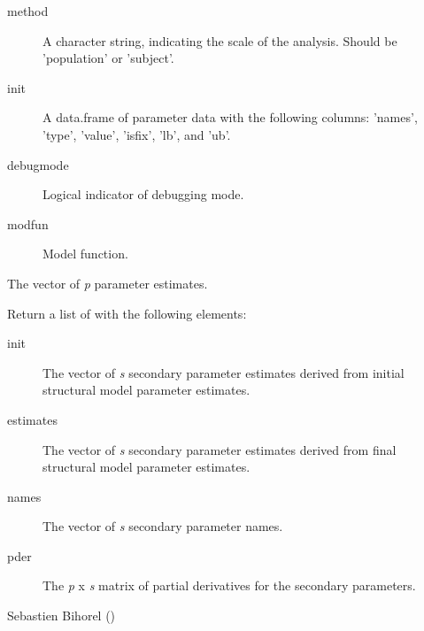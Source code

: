 \begin{Arguments}
\begin{ldescription}
\begin{description}
\item[method] A character string, indicating the scale of the analysis. Should
be 'population' or 'subject'.
\item[init] A data.frame of parameter data with the following columns:
'names', 'type', 'value', 'isfix', 'lb', and 'ub'.
\item[debugmode] Logical indicator of debugging mode.
\item[modfun] Model function.

\end{description}


\item[\code{x}] The vector of \emph{p} parameter estimates.
\end{ldescription}
\end{Arguments}
%
\begin{Value}
Return a list of with the following elements:\begin{description}

\item[init] The vector of \emph{s} secondary parameter estimates derived
from initial structural model parameter estimates.
\item[estimates] The vector of \emph{s} secondary parameter estimates
derived from final structural model parameter estimates.
\item[names] The vector of \emph{s} secondary parameter names.
\item[pder] The \emph{p} x \emph{s} matrix of partial derivatives for the
secondary parameters.

\end{description}

\end{Value}
%
\begin{Author}\relax
Sebastien Bihorel ()
\end{Author}
%
\begin{SeeAlso}\relax
{}
\end{SeeAlso}
